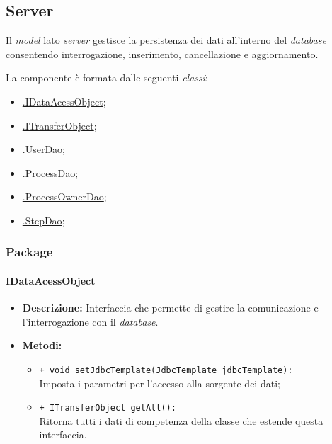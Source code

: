 \subsection{Server}

Il \textit{model} lato \textit{server} gestisce la persistenza dei dati all'interno del \textit{database} consentendo interrogazione, inserimento, cancellazione e aggiornamento.

La componente è formata dalle seguenti \textit{classi}:
\begin{itemize}
	\item \hyperref[idataacessobject]{\smodel{}.IDataAcessObject};
	\item \hyperref[itransferobject]{\smodel{}.ITransferObject};
	\item \hyperref[userdao]{\smodel{}.UserDao};
	\item \hyperref[processdao]{\smodel{}.ProcessDao};
	\item \hyperref[processownerdao]{\smodel{}.ProcessOwnerDao};
	\item \hyperref[stepdao]{\smodel{}.StepDao};
\end{itemize}

\subsubsection{Package \model{}}

\paragraph{IDataAcessObject}
\label{idataacessobject}
\begin{flushleft}
\begin{itemize}
\item \textbf{Descrizione:} Interfaccia che permette di gestire la comunicazione e l'interrogazione con il \textit{database}.
\item \textbf{Metodi:}
\begin{sloppypar}
\begin{itemize}
\item \texttt{+ void setJdbcTemplate(JdbcTemplate jdbcTemplate):}\\ Imposta i parametri per l'accesso alla sorgente dei dati;
\item \texttt{+ ITransferObject getAll():}\\ Ritorna tutti i dati di competenza della classe che estende questa interfaccia.
\end{itemize}
\end{sloppypar}
\end{itemize}
\end{flushleft}

